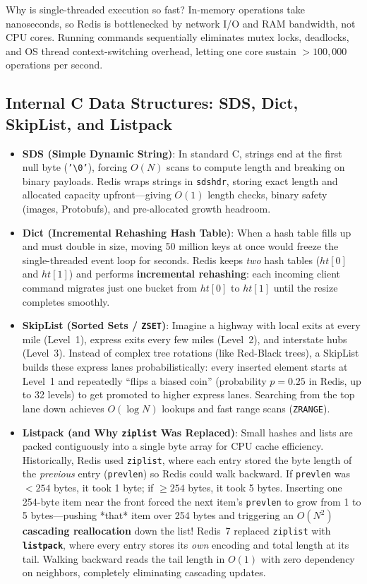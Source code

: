 Why is single-threaded execution so fast? In-memory operations take nanoseconds, so Redis is bottlenecked by network I/O and RAM bandwidth, not CPU cores. Running commands sequentially eliminates mutex locks, deadlocks, and OS thread context-switching overhead, letting one core sustain $>100{,}000$ operations per second.

\subsection{Internal C Data Structures: SDS, Dict, SkipList, and Listpack}

\begin{itemize}[leftmargin=18pt]
  \item \textbf{SDS (Simple Dynamic String)}: In standard C, strings end at the first null byte (\texttt{'\textbackslash 0'}), forcing $O(N)$ scans to compute length and breaking on binary payloads. Redis wraps strings in \texttt{sdshdr}, storing exact length and allocated capacity upfront---giving $O(1)$ length checks, binary safety (images, Protobufs), and pre-allocated growth headroom.
  \item \textbf{Dict (Incremental Rehashing Hash Table)}: When a hash table fills up and must double in size, moving 50 million keys at once would freeze the single-threaded event loop for seconds. Redis keeps \emph{two} hash tables ($ht[0]$ and $ht[1]$) and performs \textbf{incremental rehashing}: each incoming client command migrates just one bucket from $ht[0]$ to $ht[1]$ until the resize completes smoothly.
  \item \textbf{SkipList (Sorted Sets / \texttt{ZSET})}: Imagine a highway with local exits at every mile (Level~1), express exits every few miles (Level~2), and interstate hubs (Level~3). Instead of complex tree rotations (like Red-Black trees), a SkipList builds these express lanes probabilistically: every inserted element starts at Level~1 and repeatedly ``flips a biased coin'' (probability $p = 0.25$ in Redis, up to 32 levels) to get promoted to higher express lanes. Searching from the top lane down achieves $O(\log N)$ lookups and fast range scans (\texttt{ZRANGE}).
  \item \textbf{Listpack (and Why \texttt{ziplist} Was Replaced)}: Small hashes and lists are packed contiguously into a single byte array for CPU cache efficiency. Historically, Redis used \texttt{ziplist}, where each entry stored the byte length of the \emph{previous} entry (\texttt{prevlen}) so Redis could walk backward. If \texttt{prevlen} was $< 254$ bytes, it took 1 byte; if $\ge 254$ bytes, it took 5 bytes. Inserting one 254-byte item near the front forced the next item's \texttt{prevlen} to grow from 1 to 5 bytes---pushing *that* item over 254 bytes and triggering an $O(N^2)$ \textbf{cascading reallocation} down the list! Redis~7 replaced \texttt{ziplist} with \textbf{\texttt{listpack}}, where every entry stores its \emph{own} encoding and total length at its tail. Walking backward reads the tail length in $O(1)$ with zero dependency on neighbors, completely eliminating cascading updates.
\end{itemize}


